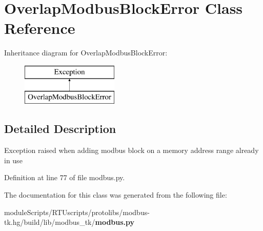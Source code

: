 \section{Overlap\+Modbus\+Block\+Error Class Reference}
\label{classmodbus__tk_1_1modbus_1_1_overlap_modbus_block_error}
Inheritance diagram for Overlap\+Modbus\+Block\+Error\+:\begin{figure}[H]
\begin{center}
\leavevmode
\includegraphics[height=2.000000cm]{classmodbus__tk_1_1modbus_1_1_overlap_modbus_block_error}
\end{center}
\end{figure}


\subsection{Detailed Description}
\begin{DoxyVerb}Exception raised when adding modbus block on a memory address
range already in use
\end{DoxyVerb}
 

Definition at line 77 of file modbus.\+py.



The documentation for this class was generated from the following file\+:\begin{DoxyCompactItemize}
\item 
module\+Scripts/\+R\+T\+Uscripts/protolibs/modbus-\/tk.\+hg/build/lib/modbus\+\_\+tk/{\bf modbus.\+py}\end{DoxyCompactItemize}
